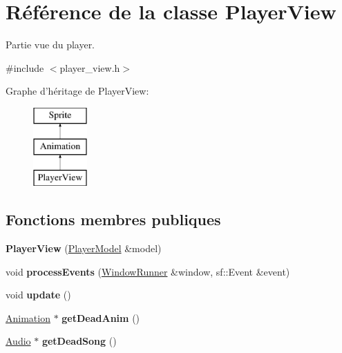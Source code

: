 \hypertarget{class_player_view}{\section{Référence de la classe Player\+View}
\label{class_player_view}
}


Partie vue du player.  




{\ttfamily \#include $<$player\+\_\+view.\+h$>$}

Graphe d'héritage de Player\+View\+:\begin{figure}[H]
\begin{center}
\leavevmode
\includegraphics[height=3.000000cm]{class_player_view}
\end{center}
\end{figure}
\subsection*{Fonctions membres publiques}
\begin{DoxyCompactItemize}
\item 
\hypertarget{class_player_view_ac351a64c53a608723db4b2bbf1ebf02c}{{\bfseries Player\+View} (\hyperlink{class_player_model}{Player\+Model} \&model)}\label{class_player_view_ac351a64c53a608723db4b2bbf1ebf02c}

\item 
\hypertarget{class_player_view_a25f77210a4b2693511b1cb1e96faecc5}{void {\bfseries process\+Events} (\hyperlink{class_window_runner}{Window\+Runner} \&window, sf\+::\+Event \&event)}\label{class_player_view_a25f77210a4b2693511b1cb1e96faecc5}

\item 
\hypertarget{class_player_view_ab9312aec42e72225d9ad82deb5ccf3c9}{void {\bfseries update} ()}\label{class_player_view_ab9312aec42e72225d9ad82deb5ccf3c9}

\item 
\hypertarget{class_player_view_a0f1e971ab7ff4d8199c59d9d4a2f3b6c}{\hyperlink{class_animation}{Animation} $\ast$ {\bfseries get\+Dead\+Anim} ()}\label{class_player_view_a0f1e971ab7ff4d8199c59d9d4a2f3b6c}

\item 
\hypertarget{class_player_view_a36fdf36b40706e4635aed3d60277141c}{\hyperlink{class_audio}{Audio} $\ast$ {\bfseries get\+Dead\+Song} ()}\label{class_player_view_a36fdf36b40706e4635aed3d60277141c}

\end{DoxyCompactItemize}
